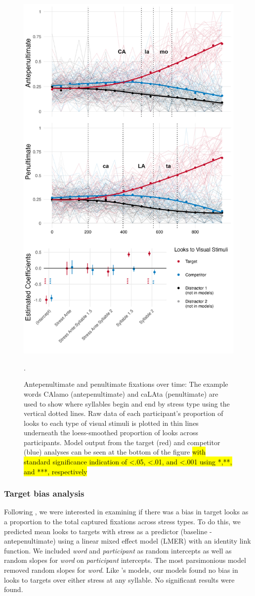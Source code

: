 \begin{figure}[H]
  \centering
  \includegraphics[width=0.6\linewidth]{visuals/pen_vs_anti_pen_id_combo.jpeg} %
  \caption{Antepenultimate and penultimate fixations over time: The example words CAlamo (antepenultimate) and caLAta (penultimate) are used to show where syllables begin and end by stress type using the vertical dotted lines. Raw data of each participant's proportion of looks to each type of visual stimuli is plotted in thin lines underneath the loess-smoothed proportion of looks across participants. Model output from the target (red) and competitor (blue) analyses can be seen at the bottom of the figure \hl{with standard significance indication of \textless .05, \textless .01, and \textless .001 using *,**, and ***, respectively}}. 
  \label{fig:raw_pen_vs_anti}
\end{figure}

\subsubsection{Target bias analysis}

Following \cite{Sulpizio_McQueen_2012}, we were interested in examining if there was a bias in target looks as a proportion to the total captured fixations across stress types. To do this, we predicted mean looks to targets with stress as a predictor (baseline - antepenultimate) using a linear mixed effect model (LMER) with an identity link function. We included \textit{word} and \textit{participant} as random intercepts as well as random slopes for \textit{word} on \textit{participant} intercepts. The most parsimonious model removed random slopes for \textit{word}. Like \cite{Sulpizio_McQueen_2012}'s models, our models found no bias in looks to targets over either stress at any syllable. No significant results were found.  

